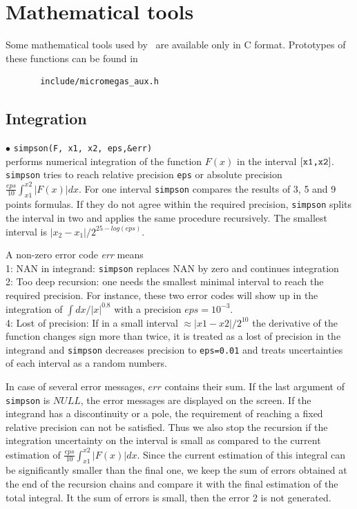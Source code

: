 \documentclass[12pt,a4paper]{article}
\begin{document}
\section{Mathematical tools}

Some mathematical tools used by \micro\ are available only 
in C format. Prototypes of these functions can be found in
\begin{verbatim}
       include/micromegas_aux.h 
\end{verbatim}

\subsection{Integration}
\label{Simpson}
\noindent$\bullet$ \verb|simpson(F, x1, x2, eps,&err)|\\
performs numerical integration of the function $F(x)$ in the interval $[\verb|x1,x2|]$.
{\tt simpson} tries to reach  relative precision \verb|eps| or absolute precision $\frac{eps}{10}
\int_{x1}^{x2}|F(x)|dx$.  
For one  interval {\tt simpson} compares the results of  3, 5 and 9 points formulas.
If they do not agree within the  required precision, {\tt simpson} splits the interval in two 
and applies the same procedure  recursively. The smallest interval is
$|x_2-x_1|/2^{25-log(eps)}$. 

A non-zero error code {\it err} means\\
1: NAN in integrand:  \verb|simpson| replaces NAN by zero and continues integration\\
2: Too deep recursion:  one needs the smallest minimal interval to reach the required precision.   For instance, these two error codes
will show up  in the  integration of   $\int dx/|x|^{0.8}$  with a precision  $eps=10^{-3}$.  \\
4: Lost of precision:   If in a small interval $\approx |x1-x2|/2^{10}$ the derivative of the 
function  changes  sign more than twice, it is treated as a lost of precision in the integrand and  \verb|simpson|
decreases precision to {\tt eps=0.01} and treats uncertainties of each interval as a random
numbers. 

In case of several error messages, $err$ contains their sum.  If the last argument of \verb|simpson| is $NULL$, the error messages are displayed on  the screen. If the integrand has a discontinuity or a pole, the requirement  of reaching a fixed relative precision can not be satisfied. Thus  we also stop the recursion if the integration uncertainty on the interval is small as compared to the current estimation of $\frac{eps}{10} \int_{x1}^{x2}|F(x)|dx$. Since the current estimation of this integral can be significantly smaller than the final one,   we keep the sum of errors obtained at  the end of the recursion chains  and compare it with the final estimation of the  total integral. It the sum of errors is small, then the error 2 is not generated.  \\
\end{document}
